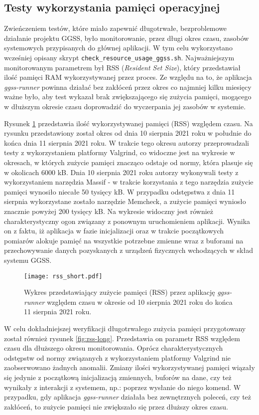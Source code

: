 \subsection{Testy wykorzystania pamięci operacyjnej}

Zwieńczeniem testów, które miało zapewnić długotrwałe, bezproblemowe działanie projektu GGSS, było monitorowanie, przez długi okres czasu, zasobów systemowych przypisanych do głównej aplikacji. W tym celu wykorzystano wcześniej opisany skrypt \lstinline{check_resource_usage_ggss.sh}. Najważniejszym monitorowanym parametrem był RSS (\emph{Resident Set Size}), który przedstawiał ilość pamięci RAM wykorzystywanej przez proces. Ze względu na to, że aplikacja \emph{ggss-runner} powinna działać bez zakłóceń przez okres co najmniej kilku miesięcy ważne było, aby test wykazał brak zwiększającego się zużycia pamięci, mogącego w dłuższym okresie czasu doprowadzić do wyczerpania jej zasobów w systemie.

Rysunek \ref{fig:rss-short} przedstawia ilość wykorzystywanej pamięci (RSS) względem czasu. Na rysunku przedstawiony został okres od dnia 10 sierpnia 2021 roku w południe do końca dnia 11 sierpnia 2021 roku. W trakcie tego okresu autorzy przeprowadzali testy z wykorzystaniem platformy Valgrind, co widoczne jest na wykresie w okresach, w których zużycie pamięci znacząco odstaje od normy, która plasuje się w okolicach 6000 kB. Dnia 10 sierpnia 2021 roku autorzy wykonywali testy z wykorzystaniem narzędzia Massif - w trakcie korzystania z tego narzędzia zużycie pamięci wynosiło niecałe 50 tysięcy kB. W przypadku odstępstwa z dnia 11 sierpnia wykorzystane zostało narzędzie Memcheck, a zużycie pamięci wyniosło znacznie powyżej 200 tysięcy kB. Na wykresie widoczny jest również charakterystyczny ogon związany z ponownym uruchomieniem aplikacji. Wynika on z faktu, iż aplikacja w fazie inicjalizacji oraz w trakcie początkowych pomiarów alokuje pamięć na wszystkie potrzebne zmienne wraz z buforami na przechowywanie danych pozyskanych z urządzeń fizycznych wchodzących w skład systemu GGSS.

\clearpage
\begin{figure}[H]
    \centering
    \texttt{[image: rss\_short.pdf]}
    \caption{Wykres przedstawiający zużycie pamięci (RSS) przez aplikację \emph{ggss-runner} względem czasu w okresie od 10 sierpnia 2021 roku do końca 11 sierpnia 2021 roku.}
    \label{fig:rss-short}
\end{figure}

W celu dokładniejszej weryfikacji długotrwałego zużycia pamięci przygotowany został również rysunek \ref{fig:rss-long}. Przedstawia on parametr RSS względem czasu dla dłuższego okresu monitorowania. Oprócz charakterystycznych odstępstw od normy związanych z wykorzystaniem platformy Valgrind nie zaobserwowano żadnych anomalii. Zmiany ilości wykorzystywanej pamięci wiązały się jedynie z początkową inicjalizacją zmiennych, buforów na dane, czy też wynikały z interakcji z systemem, np.: poprzez wysłanie do niego komend. W przypadku, gdy aplikacja \emph{ggss-runner} działała bez zewnętrznych poleceń, czy też zakłóceń, to zużycie pamięci nie zwiększało się przez dłuższy okres czasu.

